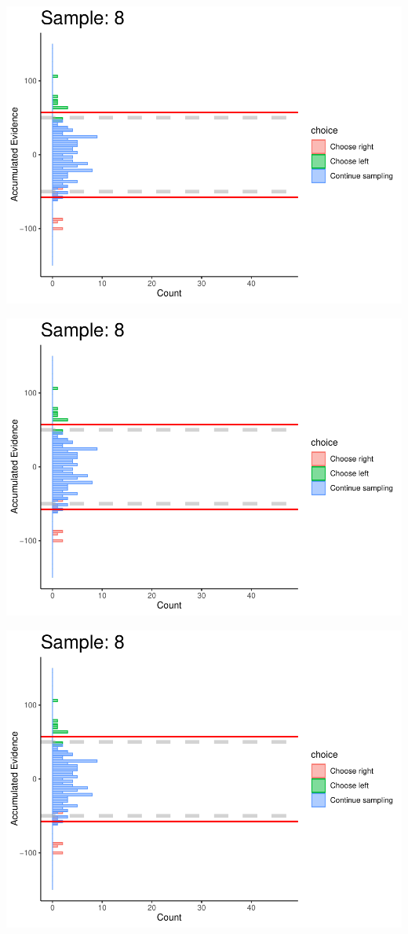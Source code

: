 \documentclass[
]{book}
\begin{document}
\begin{center}\includegraphics[width=0.8\linewidth]{LateNightBayes_files/figure-latex/fixed_dcb-73} \end{center}

\begin{center}\includegraphics[width=0.8\linewidth]{LateNightBayes_files/figure-latex/fixed_dcb-74} \end{center}

\begin{center}\includegraphics[width=0.8\linewidth]{LateNightBayes_files/figure-latex/fixed_dcb-75} \end{center}
\end{document}
